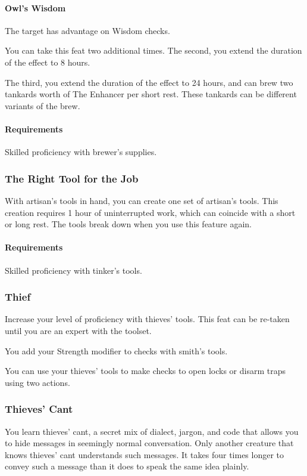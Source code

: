     \paragraph{Owl's Wisdom} The target has advantage on Wisdom checks.

    You can take this feat two additional times.
    The second, you extend the duration of the effect to 8 hours.

    The third, you extend the duration of the effect to 24 hours, and can brew two tankards worth of The Enhancer per short rest.
    These tankards can be different variants of the brew.
    \paragraph{Requirements} Skilled proficiency with brewer's supplies.
\subsubsection{The Right Tool for the Job} \label{feat::therighttoolforthejob}
    With artisan's tools in hand, you can create one set of artisan's tools.
    This creation requires 1 hour of uninterrupted work, which can coincide with a short or long rest.
    The tools break down when you use this feature again.
    \paragraph{Requirements} Skilled proficiency with tinker's tools.
\subsubsection{Thief} \label{feat::thief}
    Increase your level of proficiency with thieves' tools.
    This feat can be re-taken until you are an expert with the toolset.

    You add your Strength modifier to checks with smith's tools.

    You can use your thieves' tools to make checks to open locks or disarm traps using two actions.
\subsubsection{Thieves' Cant} \label{feat::thievescant}
    You learn thieves' cant, a secret mix of dialect, jargon, and code that allows you to hide messages in seemingly normal conversation.
    Only another creature that knows thieves' cant understands such messages.
    It takes four times longer to convey such a message than it does to speak the same idea plainly.

